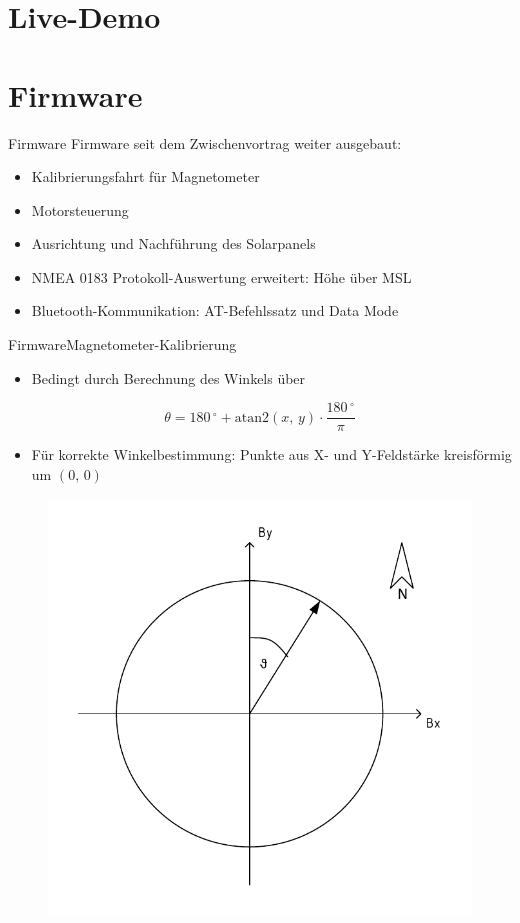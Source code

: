 \documentclass{beamer}
\begin{document}
\section{Live-Demo}

\section{Firmware}
\begin{frame}{Firmware}
    Firmware seit dem Zwischenvortrag weiter ausgebaut:
    \begin{itemize}
        \item Kalibrierungsfahrt für Magnetometer
        \item Motorsteuerung
        \item Ausrichtung und Nachführung des Solarpanels
        \item NMEA 0183 Protokoll-Auswertung erweitert: Höhe über MSL
        \item Bluetooth-Kommunikation: AT-Befehlssatz und Data Mode
    \end{itemize}
\end{frame}

\begin{frame}{Firmware}{Magnetometer-Kalibrierung}
    \begin{itemize}
        \item Bedingt durch Berechnung des Winkels über
    \end{itemize}
    \begin{equation*}
        \theta = 180\,^\circ + \mathrm{atan2}(x,\,y) \cdot \frac{180\,^\circ}{\pi}
    \end{equation*}
    \begin{itemize}
        \item Für korrekte Winkelbestimmung: Punkte aus X- und Y-Feldstärke kreisförmig um $(0,\,0)$
    \end{itemize}
    \begin{figure}[H]
        \centering
        \includegraphics[width=.5\textwidth]{./img/Kursber.pdf}
    \end{figure}
\end{frame}
\end{document}
